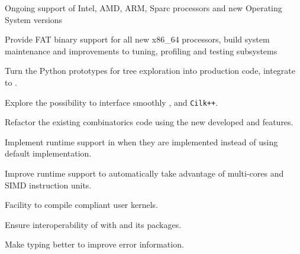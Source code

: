 \begin{workpackage}[id=hpc,wphases=36-48,
  title=High Performance Computing,
  PSRM=1, %
  LLRM=12, %
  SARM=1, %
  UKRM=1, %
  UBRM=1, %
  UJFRM=12]
\begin{wpdelivs}
\begin{wpdeliv}[due=24,id=MPIRprocessors,dissem=PU,nature=DEM]
      {Ongoing support of Intel, AMD, ARM, Sparc processors and new Operating System versions}
\end{wpdeliv}
  \begin{wpdeliv}[due=12,id=MPIRfat,dissem=PU,nature=DEM]
      {Provide FAT binary support for all new x86\_64 processors, build system maintenance and improvements to tuning, profiling and testing subsystems}
\end{wpdeliv}
  \begin{wpdeliv}[due=3,id=HPCcombi,dissem=PU,nature=DEM]
      {Turn the Python prototypes for tree exploration into    production code, integrate to \Sage.}
\end{wpdeliv}
  \begin{wpdeliv}[due=12,id=HPCcombi,dissem=PU,nature=DEM]
      {Explore the possibility to    interface smoothly \Pythran, \Cython and \texttt{Cilk++}.}
\end{wpdeliv}
  \begin{wpdeliv}[due=24,id=HPCcombi,dissem=PU,nature=DEM]
      {Refactor the existing combinatorics \Sage    code using the new developed  \Pythran and \Cython features.}
\end{wpdeliv}
  \begin{wpdeliv}[due=6,id=pythran-cython,dissem=PU,nature=DEM]
      {Implement \Pythran runtime support in \Cython when they are implemented instead of using default implementation.}
\end{wpdeliv}
  \begin{wpdeliv}[due=3,id=pythran-runtime,dissem=PU,nature=DEM]
      {Improve \Pythran runtime support to automatically take advantage of multi-cores and SIMD instruction units.}
\end{wpdeliv}
  \begin{wpdeliv}[due=2,id=pythran-sage,dissem=PU,nature=DEM]
      {Facility to compile \Pythran compliant user kernels.}
\end{wpdeliv}
  \begin{wpdeliv}[due=1,id=pythran,dissem=PU,nature=R]
      {Ensure interoperability of \Pythran with \Python and its packages.}
\end{wpdeliv}
  \begin{wpdeliv}[due=12,id=pythran-typing,dissem=PU,nature=DEM]
      {Make \Pythran typing better to improve error information.}
\end{wpdeliv}
\end{wpdelivs}
\end{workpackage}

